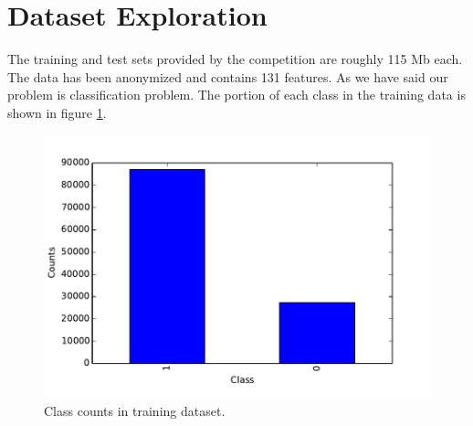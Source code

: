 \documentclass[conference, onecolumn]{IEEEtran}
\begin{document}
\section{Dataset Exploration}

The training and test sets provided by the competition are roughly 115 Mb each. The data has been anonymized and contains 131 features. As we have said our problem is classification problem. The portion of each class in the training data is shown in figure \ref{fig_de1}.


\begin{figure}[ht]
\centering
\includegraphics[width=5in, height=3in]{plot_de1.pdf}
\caption{Class counts in training dataset.}
\label{fig_de1}
\end{figure}
\end{document}
